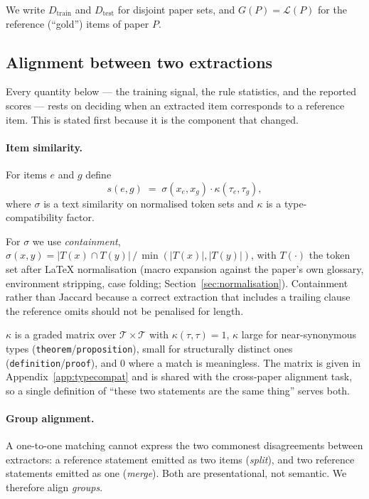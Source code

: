 We write $D_{\mathrm{train}}$ and $D_{\mathrm{test}}$ for disjoint paper sets,
and $G(P) = \mathcal{L}(P)$ for the reference (``gold'') items of paper $P$.

\subsection{Alignment between two extractions}
\label{sec:alignment}

Every quantity below --- the training signal, the rule statistics, and the
reported scores --- rests on deciding when an extracted item corresponds to a
reference item. This is stated first because it is the component that changed.

\paragraph{Item similarity.}
For items $e$ and $g$ define
\begin{equation}
  s(e, g) \;=\; \sigma\!\left(x_e, x_g\right) \cdot \kappa(\tau_e, \tau_g),
  \label{eq:sim}
\end{equation}
where $\sigma$ is a text similarity on normalised token sets and $\kappa$ is a
type-compatibility factor.

For $\sigma$ we use \emph{containment},
$\sigma(x,y) = |T(x) \cap T(y)| \,/\, \min(|T(x)|, |T(y)|)$, with $T(\cdot)$ the
token set after LaTeX normalisation (macro expansion against the paper's own
glossary, environment stripping, case folding; Section~\ref{sec:normalisation}).
Containment rather than Jaccard because a correct extraction that includes a
trailing clause the reference omits should not be penalised for length.

$\kappa$ is a graded matrix over $\mathcal{T} \times \mathcal{T}$ with
$\kappa(\tau,\tau) = 1$, $\kappa$ large for near-synonymous types
(\texttt{theorem}/\texttt{proposition}), small for structurally distinct ones
(\texttt{definition}/\texttt{proof}), and $0$ where a match is meaningless. The
matrix is given in Appendix~\ref{app:typecompat} and is shared with the
cross-paper alignment task, so a single definition of ``these two statements are
the same thing'' serves both.

\paragraph{Group alignment.}
A one-to-one matching cannot express the two commonest disagreements between
extractors: a reference statement emitted as two items (\emph{split}), and two
reference statements emitted as one (\emph{merge}). Both are presentational, not
semantic. We therefore align \emph{groups}.

